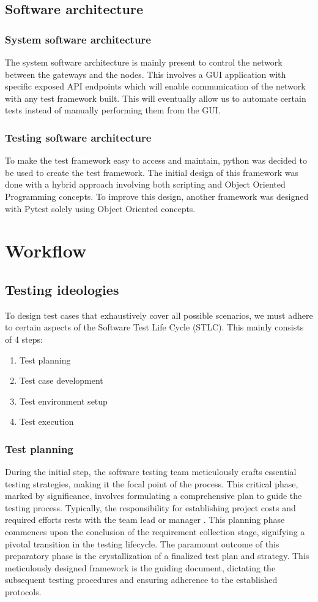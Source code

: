 \subsection{Software architecture}
\subsubsection{System software architecture}
The system software architecture is mainly present to control the network between the gateways and the nodes.
This involves a GUI application with specific exposed API endpoints which will enable communication of the network with any test framework built.
This will eventually allow us to automate certain tests instead of manually performing them from the GUI.
\subsubsection{Testing software architecture}
To make the test framework easy to access and maintain, python \cite{pythondocs} was decided to be used to create the test framework.
The initial design of this framework was done with a hybrid approach involving both scripting and Object Oriented Programming concepts.
To improve this design, another framework was designed with Pytest \cite{pytest} solely using Object Oriented concepts.
\section{Workflow}
\subsection{Testing ideologies}
To design test cases that exhaustively cover all possible scenarios, we must adhere to certain aspects of the Software Test Life Cycle (STLC). This mainly consists of 4 steps:
\begin{enumerate}
    \item Test planning
    \item Test case development
    \item Test environment setup
    \item Test execution
\end{enumerate}

\subsubsection{Test planning}
During the initial step, the software testing team meticulously crafts essential testing strategies, making it the focal point of the process.
This critical phase, marked by significance, involves formulating a comprehensive plan to guide the testing process.
Typically, the responsibility for establishing project costs and required efforts rests with the team lead or manager \cite{ref32}.
This planning phase commences upon the conclusion of the requirement collection stage, signifying a pivotal transition in the testing lifecycle.
The paramount outcome of this preparatory phase is the crystallization of a finalized test plan and strategy.
This meticulously designed framework is the guiding document, dictating the subsequent testing procedures and ensuring adherence to the established protocols.

